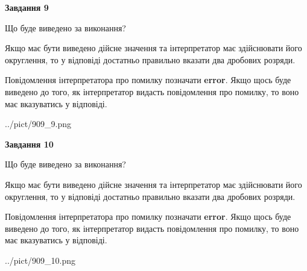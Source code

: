 \documentclass[12pt, ukrainian]{article}
\begin{document}
{\begin {Large}
{\begin {center}\textbf{Завдання 9}\end {center}}\par
Що буде виведено за виконання? \par

Якщо має бути виведено дійсне значення та інтерпретатор має здійснювати його округлення, 
то у відповіді достатньо правильно вказати два дробових розряди.

Повідомлення інтерпретатора про помилку позначати \textbf{error}.
Якщо щось буде виведено до того, як інтерпретатор видасть повідомлення про помилку, 
то воно має вказуватись у відповіді. \par

\begin{center}
	{../pict/909_9.png}
\end{center}
\newpage

{\begin {center}\textbf{Завдання 10}\end {center}}\par
Що буде виведено за виконання? \par

Якщо має бути виведено дійсне значення та інтерпретатор має здійснювати його округлення, 
то у відповіді достатньо правильно вказати два дробових розряди.

Повідомлення інтерпретатора про помилку позначати \textbf{error}.
Якщо щось буде виведено до того, як інтерпретатор видасть повідомлення про помилку, 
то воно має вказуватись у відповіді. \par

\begin{center}
	{../pict/909_10.png}
\end{center}
\newpage

\end {Large}}
\end{document}
